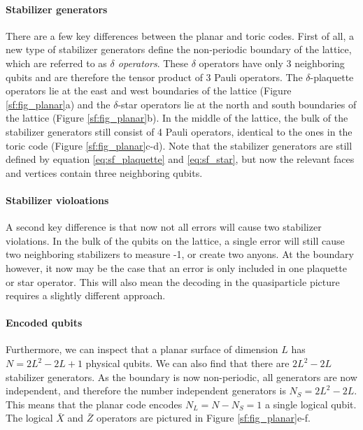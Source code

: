 \paragraph{Stabilizer generators}
There are a few key differences between the planar and toric codes. First of all, a new type of stabilizer generators define the non-periodic boundary of the lattice, which are referred to as \emph{$\delta$ operators}. These $\delta$ operators have only 3 neighboring qubits and are therefore the tensor product of 3 Pauli operators. The $\delta$-plaquette operators lie at the east and west boundaries of the lattice (Figure \ref{sf:fig_planar}a) and the $\delta$-star operators lie at the north and south boundaries of the lattice (Figure \ref{sf:fig_planar}b). In the middle of the lattice, the bulk of the stabilizer generators still consist of 4 Pauli operators, identical to the ones in the toric code (Figure \ref{sf:fig_planar}c-d). Note that the stabilizer generators are still defined by equation \ref{eq:sf_plaquette} and \ref{eq:sf_star}, but now the relevant faces and vertices contain three neighboring qubits.

\paragraph{Stabilizer violoations}
A second key difference is that now not all errors will cause two stabilizer violations. In the bulk of the qubits on the lattice, a single error will still cause two neighboring stabilizers to measure -1, or create two anyons. At the boundary however, it now may be the case that an error is only included in one plaquette or star operator. This will also mean the decoding in the quasiparticle picture requires a slightly different approach.

\paragraph{Encoded qubits}
Furthermore, we can inspect that a planar surface of dimension $L$ has $N = 2L^2-2L+1$ physical qubits. We can also find that there are $2L^2-2L$ stabilizer generators. As the boundary is now non-periodic, all generators are now independent, and therefore the number independent generators is $N_S = 2L^2-2L$. This means that the planar code encodes $N_L = N-N_S = 1$ a single logical qubit. The logical $\bar{X}$ and $\bar{Z}$ operators are pictured in Figure \ref{sf:fig_planar}e-f.

